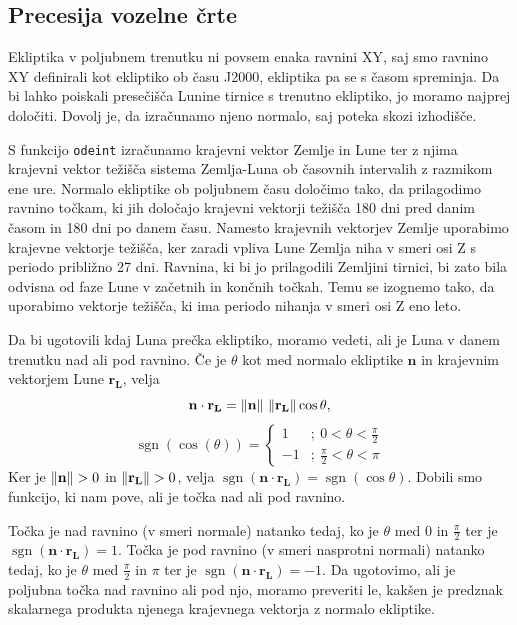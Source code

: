 \documentclass[a4paper,12pt]{article}
\renewcommand{\vec}[1]{\mathbf{#1}} %
\newcommand{\sgn}{\operatorname{sgn}}
\begin{document}
\newpage
\subsection{Precesija vozelne črte}
Ekliptika v poljubnem trenutku ni povsem enaka ravnini XY, saj smo ravnino XY 
definirali kot ekliptiko ob času J2000, ekliptika pa se s časom spreminja. Da 
bi lahko poiskali presečišča Lunine tirnice s trenutno ekliptiko, jo moramo 
najprej določiti. Dovolj je, da izračunamo njeno normalo, saj poteka skozi 
izhodišče.

S funkcijo \texttt{odeint} izračunamo krajevni vektor Zemlje 
in Lune ter z njima krajevni vektor težišča sistema Zemlja-Luna ob časovnih 
intervalih z razmikom ene ure. Normalo ekliptike ob poljubnem času določimo 
tako, da prilagodimo ravnino točkam, ki jih določajo krajevni vektorji težišča 
180 dni pred danim časom in 180 dni po danem času. Namesto krajevnih vektorjev 
Zemlje uporabimo krajevne vektorje težišča, ker zaradi vpliva Lune Zemlja niha 
v smeri osi Z s periodo približno 27 dni. Ravnina, ki bi jo prilagodili 
Zemljini tirnici, bi zato bila odvisna od faze Lune v začetnih in končnih 
točkah. Temu se izognemo tako, da uporabimo vektorje težišča, ki ima periodo
nihanja v smeri osi Z eno leto.

Da bi ugotovili kdaj Luna prečka ekliptiko, moramo vedeti, ali je Luna v danem 
trenutku nad ali pod ravnino. Če je $\theta$ kot med normalo ekliptike 
$\vec{n}$ in krajevnim vektorjem Lune $\vec{r_L}$, velja
\begin{equation*}
    \vec{n} \cdot \vec{r_L} = \norm{\vec{n}}\ \norm{\vec{r_L}} \cos{\theta},
\end{equation*}
\begin{equation*}
\sgn(\cos(\theta))=\left\{
    \begin{array}{ll}
        {1} & { ;\ 0 < \theta < \frac{\pi}{2}} \\ 
        {-1} & { ;\ \frac{\pi}{2} < \theta < \pi}
    \end{array}\right.
\end{equation*}
Ker je $\norm{\vec{n}} > 0$ in $\norm{\vec{r_L}} > 0$, velja 
$\sgn(\vec{n}\cdot\vec{r_L}) = \sgn(\cos{\theta})$. Dobili smo funkcijo, ki
nam pove, ali je točka nad ali pod ravnino. 

Točka je nad ravnino (v smeri normale) natanko tedaj, ko je $\theta$ med $0$ 
in $\frac{\pi}{2}$ ter je $\sgn(\vec{n}\cdot\vec{r_L}) = 1$. Točka je pod 
ravnino (v smeri nasprotni normali) natanko tedaj, ko je $\theta$ med 
$\frac{\pi}{2}$ in $\pi$ ter je $\sgn(\vec{n}\cdot\vec{r_L}) = -1$. Da 
ugotovimo, ali je poljubna točka nad ravnino ali pod njo, moramo preveriti le, 
kakšen je predznak skalarnega produkta njenega krajevnega vektorja z normalo 
ekliptike.
\end{document}
